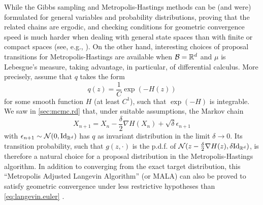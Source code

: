 While the Gibbs sampling and Metropolis-Hastings methods can be (and were) formulated for general variables and probability distributions,  proving that the related chains are ergodic, and checking conditions for  geometric convergence speed is much harder when dealing with general state spaces than with finite or compact spaces (see, e.g., \citep{roberts1994geometric,mengersen1996rates,amit1996convergence,
roberts2004general}).
On the other hand, interesting choices of proposal transitions for Metropolis-Hastings are available when ${\mathcal B} = {\mathbb{R}}^d$ and $\mu$ is Lebesgue's measure, taking advantage, in particular, of differential calculus.  More precisely, assume that $q$ takes the form
\[
q(z)= \frac{1}{C} \exp(- H(z))
\]
for some smooth function $H$ (at least $C^1$), such that $\exp(-H)$ is integrable. We saw in \cref{sec:mcmc.rd} that, under suitable assumptions, the Markov chain
\begin{equation}
\label{eq:langevin.euler}
X_{n+1} = X_n - \frac\delta 2  \nabla H(X_n) + \sqrt{\delta} \epsilon_{n+1}
\end{equation}
with $\epsilon_{n+1} \sim \CN(0, \Id[d])$ has $q$ as invariant distribution in the limit $\delta \to 0$. Its transition probability, such that $g(z, \cdot)$ is the p.d.f. of $\CN( z - \frac \delta 2 \nabla H(z), \delta \Id[d])$, is therefore a natural choice for a proposal distribution in the Metropolis-Hastings algorithm. In addition to converging  from the exact target distribution, this ``Metropolis Adjusted Langevin Algorithm'' (or MALA) can also be proved to satisfy geometric convergence under less restrictive hypotheses than \cref{eq:langevin.euler} \citep{roberts1996exponential}.



